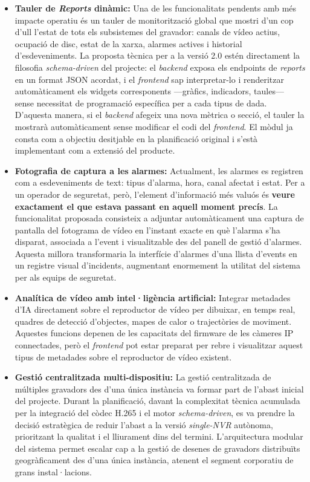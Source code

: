 \begin{itemize}
    \item \textbf{Tauler de \textit{Reports} dinàmic:} Una de les funcionalitats pendents amb més impacte operatiu és un tauler de monitorització global que mostri d'un cop d'ull l'estat de tots els subsistemes del gravador: canals de vídeo actius, ocupació de disc, estat de la xarxa, alarmes actives i historial d'esdeveniments. La proposta tècnica per a la versió 2.0 estén directament la filosofia \textit{schema-driven} del projecte: el \textit{backend} exposa els endpoints de \textit{reports} en un format JSON acordat, i el \textit{frontend} sap interpretar-lo i renderitzar automàticament els widgets corresponents —gràfics, indicadors, taules— sense necessitat de programació específica per a cada tipus de dada. D'aquesta manera, si el \textit{backend} afegeix una nova mètrica o secció, el tauler la mostrarà automàticament sense modificar el codi del \textit{frontend}. El mòdul ja consta com a objectiu desitjable en la planificació original i s'està implementant com a extensió del producte.

    \item \textbf{Fotografia de captura a les alarmes:} Actualment, les alarmes es registren com a esdeveniments de text: tipus d'alarma, hora, canal afectat i estat. Per a un operador de seguretat, però, l'element d'informació més valuós és \textbf{veure exactament el que estava passant en aquell moment precís}. La funcionalitat proposada consisteix a adjuntar automàticament una captura de pantalla del fotograma de vídeo en l'instant exacte en què l'alarma s'ha disparat, associada a l'event i visualitzable des del panell de gestió d'alarmes. Aquesta millora transformaria la interfície d'alarmes d'una llista d'events en un registre visual d'incidents, augmentant enormement la utilitat del sistema per als equips de seguretat.

    \item \textbf{Analítica de vídeo amb intel·ligència artificial:} Integrar metadades d'IA directament sobre el reproductor de vídeo per dibuixar, en temps real, quadres de detecció d'objectes, mapes de calor o trajectòries de moviment. Aquestes funcions depenen de les capacitats del firmware de les càmeres IP connectades, però el \textit{frontend} pot estar preparat per rebre i visualitzar aquest tipus de metadades sobre el reproductor de vídeo existent.

    \item \textbf{Gestió centralitzada multi-dispositiu:} La gestió centralitzada de múltiples gravadors des d'una única instància va formar part de l'abast inicial del projecte. Durant la planificació, davant la complexitat tècnica acumulada per la integració del còdec H.265 i el motor \textit{schema-driven}, es va prendre la decisió estratègica de reduir l'abast a la versió \textit{single-NVR} autònoma, prioritzant la qualitat i el lliurament dins del termini. L'arquitectura modular del sistema permet escalar cap a la gestió de desenes de gravadors distribuïts geogràficament des d'una única instància, atenent el segment corporatiu de grans instal·lacions.


\end{itemize}
